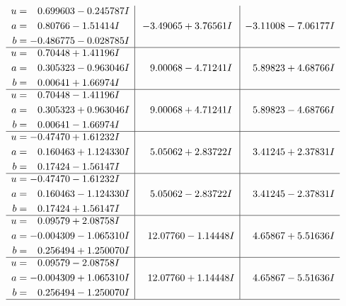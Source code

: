 \documentclass[1p]{elsarticle_modified}
\theoremstyle{definition}
\begin{document}
$$\begin{array}{c|c|c}
\begin{aligned}
u &= \phantom{-}0.699603 - 0.245787 I \\
a &= \phantom{-}0.80766 - 1.51414 I \\
b &= -0.486775 - 0.028785 I\end{aligned}
 & -3.49065 + 3.76561 I & -3.11008 - 7.06177 I \\ \hline\begin{aligned}
u &= \phantom{-}0.70448 + 1.41196 I \\
a &= \phantom{-}0.305323 - 0.963046 I \\
b &= \phantom{-}0.00641 + 1.66974 I\end{aligned}
 & \phantom{-}9.00068 - 4.71241 I & \phantom{-}5.89823 + 4.68766 I \\ \hline\begin{aligned}
u &= \phantom{-}0.70448 - 1.41196 I \\
a &= \phantom{-}0.305323 + 0.963046 I \\
b &= \phantom{-}0.00641 - 1.66974 I\end{aligned}
 & \phantom{-}9.00068 + 4.71241 I & \phantom{-}5.89823 - 4.68766 I \\ \hline\begin{aligned}
u &= -0.47470 + 1.61232 I \\
a &= \phantom{-}0.160463 + 1.124330 I \\
b &= \phantom{-}0.17424 - 1.56147 I\end{aligned}
 & \phantom{-}5.05062 + 2.83722 I & \phantom{-}3.41245 + 2.37831 I \\ \hline\begin{aligned}
u &= -0.47470 - 1.61232 I \\
a &= \phantom{-}0.160463 - 1.124330 I \\
b &= \phantom{-}0.17424 + 1.56147 I\end{aligned}
 & \phantom{-}5.05062 - 2.83722 I & \phantom{-}3.41245 - 2.37831 I \\ \hline\begin{aligned}
u &= \phantom{-}0.09579 + 2.08758 I \\
a &= -0.004309 - 1.065310 I \\
b &= \phantom{-}0.256494 + 1.250070 I\end{aligned}
 & \phantom{-}12.07760 - 1.14448 I & \phantom{-}4.65867 + 5.51636 I \\ \hline\begin{aligned}
u &= \phantom{-}0.09579 - 2.08758 I \\
a &= -0.004309 + 1.065310 I \\
b &= \phantom{-}0.256494 - 1.250070 I\end{aligned}
 & \phantom{-}12.07760 + 1.14448 I & \phantom{-}4.65867 - 5.51636 I\\
 \hline 
 \end{array}$$\newpage
\end{document}

